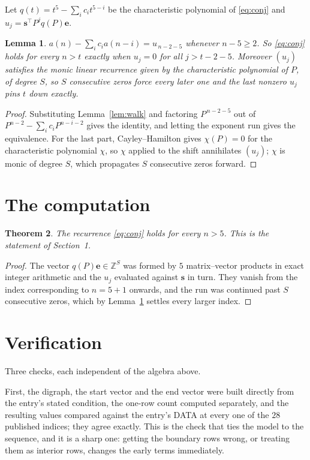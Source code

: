 \documentclass[11pt,a4paper]{article}
\theoremstyle{plain}
\newtheorem{theorem}{Theorem}
\newtheorem{lemma}[theorem]{Lemma}
\theoremstyle{definition}
\begin{document}
Let $q(t)=t^{5}-\sum_i c_i t^{5-i}$ be the characteristic polynomial of
\eqref{eq:conj} and $u_j=\mathbf{s}^{\!\top}P^{j}q(P)\mathbf{e}$.

\begin{lemma}\label{lem:crit}
$a(n)-\sum_i c_i a(n-i)=u_{\,n-2-5}$ whenever $n-5\ge2$. So \eqref{eq:conj}
holds for every $n>t$ exactly when $u_j=0$ for all $j>t-2-5$. Moreover $(u_j)$
satisfies the monic linear recurrence given by the characteristic polynomial of $P$, of
degree $S$, so $S$ consecutive zeros force every later one and the last nonzero $u_j$ pins
$t$ down exactly.
\end{lemma}

\begin{proof}
Substituting Lemma~\ref{lem:walk} and factoring $P^{\,n-2-5}$ out of
$P^{n-2}-\sum_i c_i P^{n-i-2}$ gives the identity, and letting the exponent run gives the
equivalence. For the last part, Cayley--Hamilton gives $\chi(P)=0$ for the characteristic
polynomial $\chi$, so $\chi$ applied to the shift annihilates $(u_j)$; $\chi$ is monic of
degree $S$, which propagates $S$ consecutive zeros forward.
\end{proof}

\section{The computation}

\begin{theorem}
The recurrence \eqref{eq:conj} holds for every $n>5$. This is the statement of
Section~1.
\end{theorem}

\begin{proof}
The vector $q(P)\mathbf{e}\in\mathbb{Z}^{S}$ was formed by $5$ matrix--vector
products in exact integer arithmetic and the $u_j$ evaluated against $\mathbf{s}$ in turn.
They vanish from the index corresponding to $n=5+1$ onwards, and the run was continued
past $S$ consecutive zeros, which by Lemma~\ref{lem:crit} settles every larger index.
\end{proof}

\section{Verification}

Three checks, each independent of the algebra above.

First, the digraph, the start vector and the end vector were built directly from the
entry's stated condition, the one-row count computed separately, and the resulting values
compared against the entry's DATA at every one of the $28$ published indices; they
agree exactly. This is the check that ties the model to the sequence, and it is a sharp one:
getting the boundary rows wrong, or treating them as interior rows, changes the early terms
immediately.
\end{document}
